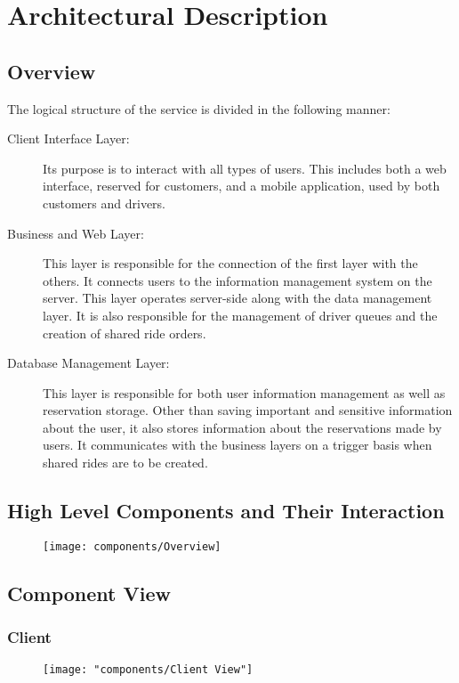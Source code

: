 \section{Architectural Description}

\subsection{Overview}
	The logical structure of the service is divided in the following manner:
	\begin{description}
		\item[Client Interface Layer:] Its purpose is to interact with all types of users. This includes both a web interface, reserved for customers, and a mobile application,
			used by both customers and drivers.
		\item[Business and Web Layer:] This layer is responsible for the connection of the first layer with the others. It connects users to the information management
			system on the server. This layer operates server-side along with the data management layer. It is also responsible for the management of driver queues and
			the creation of shared ride orders.
		\item[Database Management Layer:] This layer is responsible for both user information management as well as reservation storage. Other than saving important and sensitive
			information about the user, it also stores information about the reservations made by users. It communicates with the business layers on a trigger basis when shared rides
			are to be created.
	\end{description}
\subsection{High Level Components and Their Interaction}

	\begin{figure}[h!]
		\centering
		\texttt{[image: components/Overview]}
	\end{figure}

\subsection{Component View}
	\subsubsection{Client}
		\begin{figure}[h!]
			\centering
			\texttt{[image: "components/Client View"]}
		\end{figure}
